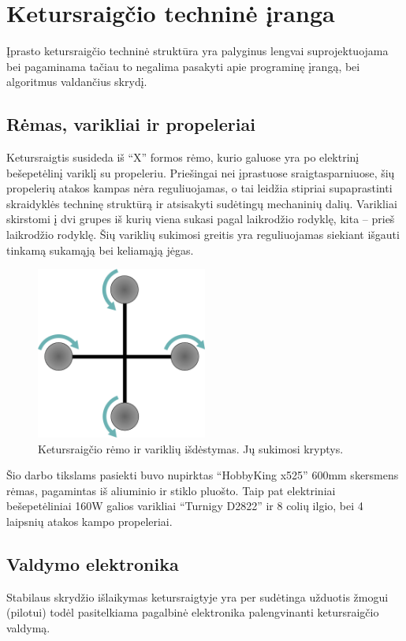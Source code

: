 \documentclass[12pt, a4paper, lithuanian, final]{article}
\begin{document}
\section{Ketursraigčio techninė įranga}
Įprasto ketursraigčio techninė struktūra yra palyginus lengvai suprojektuojama bei pagaminama tačiau to negalima pasakyti apie programinę įrangą, bei algoritmus valdančius skrydį.



\subsection{Rėmas, varikliai ir propeleriai}
Ketursraigtis susideda iš "`X"' formos rėmo, kurio galuose yra po elektrinį bešepetėlinį variklį su propeleriu.
Priešingai nei įprastuose sraigtasparniuose, šių propelerių atakos kampas nėra reguliuojamas, o tai leidžia stipriai supaprastinti skraidyklės techninę struktūrą ir atsisakyti sudėtingų mechaninių dalių.
Varikliai skirstomi į dvi grupes iš kurių viena sukasi pagal laikrodžio rodyklę, kita -- prieš laikrodžio rodyklę.
Šių variklių sukimosi greitis yra reguliuojamas siekiant išgauti tinkamą sukamąją bei keliamąją jėgas.

\begin{figure}[H]
\begin{center}
\includegraphics[width=0.5\textwidth]{img/rotor-direction.png}
\caption{Ketursraigčio rėmo ir variklių išdėstymas. Jų sukimosi kryptys.}
\end{center}
\end{figure}

Šio darbo tikslams pasiekti buvo nupirktas "`HobbyKing x525"' 600mm skersmens rėmas, pagamintas iš aliuminio ir stiklo pluošto.
Taip pat elektriniai bešepetėliniai 160W galios varikliai "`Turnigy D2822"' ir 8 colių ilgio, bei 4 laipsnių atakos kampo propeleriai.


\subsection{Valdymo elektronika}
Stabilaus skrydžio išlaikymas ketursraigtyje yra per sudėtinga užduotis žmogui (pilotui) todėl pasitelkiama pagalbinė elektronika palengvinanti ketursraigčio valdymą.
\end{document}
